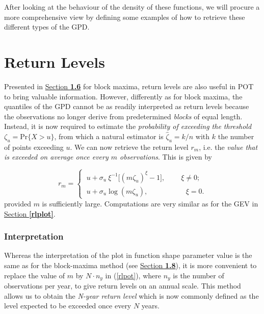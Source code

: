After looking at the behaviour of the density of these functions, we will procure a more comprehensive view by defining some examples of how to retrieve these different types of the GPD.


\section{Return Levels}\label{sec:rl_gpd}

Presented in \hyperref[rlgev]{Section \textbf{1.6}} for block maxima, return levels are also useful in POT to bring valuable information. 
However, differently as for block maxima, the quantiles of the GPD cannot be as readily interpreted as return levels because the observations no longer derive from predetermined \emph{blocks} of equal length. Instead, it is now required to estimate the \emph{probability of exceeding the threshold} $\zeta_u=\text{Pr}\big\{X>u\big\}$, from which a natural estimator is $\hat{\zeta}_u=k/n$ with $k$ the number of points exceeding $u$.
We can now retrieve the return level $r_m$, i.e. the\emph{ value that is exceeded on average once every $m$ observations}. 
This is given by 

\begin{equation}\label{rlpot}
r_m=\begin{cases}
\ u+\sigma_u\ \xi^{-1}\Big[(m\zeta_u)^{\xi}-1\Big], \ \ \ \ \ \ \ \ \  \ \xi\neq 0;\\
\ u +\sigma_u \log(m\zeta_u), \ \quad \ \ \ \ \ \ \  \ \ \ \ \ \ \quad \ \xi =0.
\end{cases}
\end{equation}
provided $m$ is sufficiently large.
Computations are very similar as for the GEV in \hyperref[rlplot]{Section \textbf{\ref{rlplot}}}. 

\subsubsection*{Interpretation}

Whereas the interpretation of the plot in function shape parameter value is the same as for the block-maxima method  (see \hyperref[rlplot]{Section \textbf{1.8}}), it is more convenient to replace the value of $m$ by $N\cdot n_y$ in (\ref{rlpot}), where $n_y$ is the number of observations per year, to give return levels on an annual scale. This method allows us to obtain the\emph{ N-year return level} which is now commonly defined as the level expected to be exceeded once every $N$ years.

